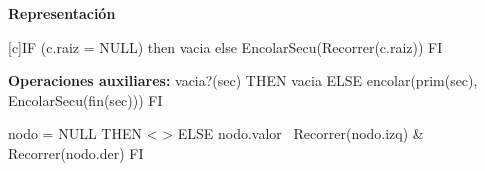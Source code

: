 \documentclass[a4paper,10pt]{article}
\newenvironment{Representacion}{%
  \vspace*{2ex}%
  \noindent\textbf{\Large Representación}%
  \vspace*{2ex}%
}{}
\begin{document}
\begin{Representacion}
   [c]{IF (c.raiz = NULL) then vacia else EncolarSecu(Recorrer(c.raiz)) FI}
   
   \textbf{Operaciones auxiliares:}
  {\IF vacia?(sec) THEN vacia ELSE encolar(prim(sec), EncolarSecu(fin(sec))) FI}
  
  
  {\IF nodo = NULL THEN < > ELSE nodo.valor \textbullet \ Recorrer(nodo.izq) \& Recorrer(nodo.der) FI}



  \BlankLine
  
  
\end{Representacion}
\end{document}

